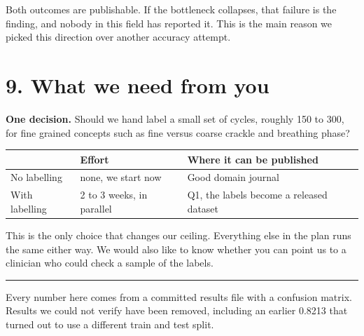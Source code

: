 \documentclass[11pt,a4paper]{article}
\newcommand{\note}[1]{{\small\color{rule}#1}}
\begin{document}
\vspace{4pt}
Both outcomes are publishable. If the bottleneck collapses, that failure is the finding,
and nobody in this field has reported it. This is the main reason we picked this
direction over another accuracy attempt.

\section*{9. What we need from you}

\textbf{One decision.} Should we hand label a small set of cycles, roughly 150 to 300,
for fine grained concepts such as fine versus coarse crackle and breathing phase?

\begin{center}
\begin{tabular}{@{}lll@{}}
\toprule
 & \textbf{Effort} & \textbf{Where it can be published} \\
\midrule
No labelling   & none, we start now      & Good domain journal \\
With labelling & 2 to 3 weeks, in parallel & Q1, the labels become a released dataset \\
\bottomrule
\end{tabular}
\end{center}

\vspace{4pt}
This is the only choice that changes our ceiling. Everything else in the plan runs the
same either way. We would also like to know whether you can point us to a clinician who
could check a sample of the labels.

\vspace{10pt}
\hrule
\vspace{4pt}
\note{Every number here comes from a committed results file with a confusion matrix.
Results we could not verify have been removed, including an earlier 0.8213 that turned
out to use a different train and test split.}
\end{document}
